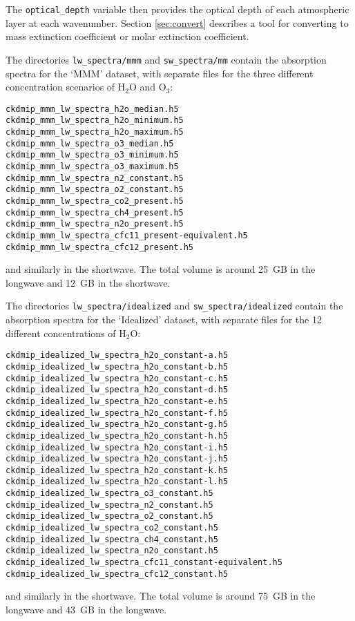 \documentclass[twoside]{article}
\def\codesize{\small}
\def\code#1{{\codesize\texttt{#1}}}
\begin{document}
The \code{optical\_depth} variable then provides the optical depth of
each atmospheric layer at each wavenumber.  Section \ref{sec:convert}
describes a tool for converting to mass extinction coefficient or
molar extinction coefficient.

The directories \code{lw\_spectra/mmm} and \code{sw\_spectra/mm}
contain the absorption spectra for the `MMM' dataset, with separate
files for the three different concentration scenarios of H$_2$O and
O$_3$:
\begin{verbatim}
ckdmip_mmm_lw_spectra_h2o_median.h5
ckdmip_mmm_lw_spectra_h2o_minimum.h5
ckdmip_mmm_lw_spectra_h2o_maximum.h5
ckdmip_mmm_lw_spectra_o3_median.h5
ckdmip_mmm_lw_spectra_o3_minimum.h5
ckdmip_mmm_lw_spectra_o3_maximum.h5
ckdmip_mmm_lw_spectra_n2_constant.h5
ckdmip_mmm_lw_spectra_o2_constant.h5
ckdmip_mmm_lw_spectra_co2_present.h5
ckdmip_mmm_lw_spectra_ch4_present.h5
ckdmip_mmm_lw_spectra_n2o_present.h5
ckdmip_mmm_lw_spectra_cfc11_present-equivalent.h5
ckdmip_mmm_lw_spectra_cfc12_present.h5
\end{verbatim}
and similarly in the shortwave. The total volume is around 25~GB in
the longwave and 12~GB in the shortwave.

The directories \code{lw\_spectra/idealized} and
\code{sw\_spectra/idealized} contain the absorption spectra for the
`Idealized' dataset, with separate files for the 12 different
concentrations of H$_2$O:
\begin{verbatim}
ckdmip_idealized_lw_spectra_h2o_constant-a.h5
ckdmip_idealized_lw_spectra_h2o_constant-b.h5
ckdmip_idealized_lw_spectra_h2o_constant-c.h5
ckdmip_idealized_lw_spectra_h2o_constant-d.h5
ckdmip_idealized_lw_spectra_h2o_constant-e.h5
ckdmip_idealized_lw_spectra_h2o_constant-f.h5
ckdmip_idealized_lw_spectra_h2o_constant-g.h5
ckdmip_idealized_lw_spectra_h2o_constant-h.h5
ckdmip_idealized_lw_spectra_h2o_constant-i.h5
ckdmip_idealized_lw_spectra_h2o_constant-j.h5
ckdmip_idealized_lw_spectra_h2o_constant-k.h5
ckdmip_idealized_lw_spectra_h2o_constant-l.h5
ckdmip_idealized_lw_spectra_o3_constant.h5
ckdmip_idealized_lw_spectra_n2_constant.h5
ckdmip_idealized_lw_spectra_o2_constant.h5
ckdmip_idealized_lw_spectra_co2_constant.h5
ckdmip_idealized_lw_spectra_ch4_constant.h5
ckdmip_idealized_lw_spectra_n2o_constant.h5
ckdmip_idealized_lw_spectra_cfc11_constant-equivalent.h5
ckdmip_idealized_lw_spectra_cfc12_constant.h5
\end{verbatim}
and similarly in the shortwave. The total volume is around 75~GB in
the longwave and 43~GB in the longwave.
\end{document}
